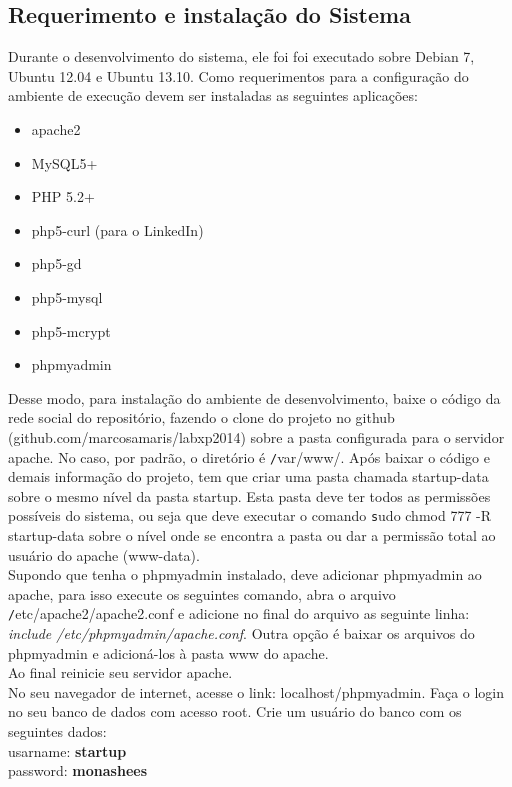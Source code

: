 \documentclass[12pt, letterpaper, onecolumn]{article}
\begin{document}
\subsection{Requerimento e instalação do Sistema} 
Durante o desenvolvimento do sistema, ele foi foi executado sobre Debian 7, Ubuntu 12.04 e Ubuntu 13.10. Como requerimentos para a configuração do ambiente de execução devem ser instaladas as seguintes aplicações:
\begin{itemize}
\item apache2
\item MySQL5+
\item PHP 5.2+
\item php5-curl (para o LinkedIn)
\item php5-gd 
\item php5-mysql 
\item php5-mcrypt
\item phpmyadmin
\end{itemize}

Desse modo, para instalação do ambiente de desenvolvimento, baixe o código da rede social do repositório, fazendo o clone do projeto no github (github.com/marcosamaris/labxp2014) sobre a pasta configurada para o servidor apache. No caso, por padrão, o diretório é {\texttt /var/www/}. Após baixar o código e demais informação do projeto, tem que criar uma pasta chamada startup-data sobre o mesmo nível da pasta startup. Esta pasta deve ter todos as permissões possíveis do sistema, ou seja que deve executar o comando {\texttt sudo chmod 777 -R startup-data} sobre o nível onde se encontra a pasta ou dar a permissão total ao usuário do apache (www-data).\\

Supondo que tenha o phpmyadmin instalado, deve adicionar phpmyadmin ao apache, para isso execute os seguintes comando, abra o arquivo {\texttt /etc/apache2/apache2.conf} e adicione no final do arquivo as seguinte linha: {\it include /etc/phpmyadmin/apache.conf}. Outra opção é baixar os arquivos do phpmyadmin e adicioná-los à pasta www do apache.\\

Ao final  reinicie seu servidor apache.\\
   
No seu navegador de internet, acesse o link: localhost/phpmyadmin. Faça o login no seu banco de dados com acesso root. Crie um usuário do banco com os seguintes dados:\\
        usarname: {\bf startup}\\
        password: {\bf monashees}\\
\end{document}
